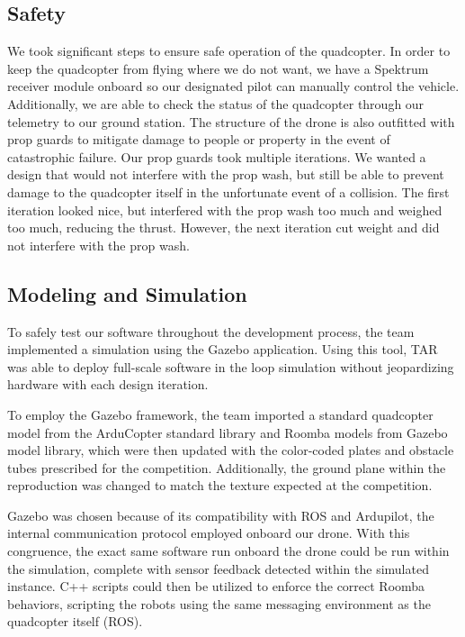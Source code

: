 \documentclass[12pt,letterpaper]{article}
\begin{document}
	\subsection*{Safety}
		We took significant steps to ensure safe operation of the quadcopter. In order to keep the quadcopter from flying where we do not want, we have a Spektrum receiver module onboard so our designated pilot can manually control the vehicle. Additionally, we are able to check the status of the quadcopter through our telemetry to our ground station. The structure of the drone is also outfitted with prop guards to mitigate damage to people or property in the event of catastrophic failure. Our prop guards took multiple iterations. We wanted a design that would not interfere with the prop wash, but still be able to prevent damage to the quadcopter itself in the unfortunate event of a collision. The first iteration looked nice, but interfered with the prop wash too much and weighed too much, reducing the thrust. However, the next iteration cut weight and did not interfere with the prop wash.


	\subsection*{Modeling and Simulation}

		To safely test our software throughout the development process, the team implemented a simulation using the Gazebo application. Using this tool, TAR was able to deploy full-scale software in the loop simulation without jeopardizing hardware with each design iteration.

		To employ the Gazebo framework, the team imported a standard quadcopter model from the ArduCopter standard library and Roomba models from Gazebo model library, which were then updated with the color-coded plates and obstacle tubes prescribed for the competition. Additionally, the ground plane within the reproduction was changed to match the texture expected at the competition.

		Gazebo was chosen because of its compatibility with ROS and Ardupilot, the internal communication protocol employed onboard our drone. With this congruence, the exact same software run onboard the drone could be run within the simulation, complete with sensor feedback detected within the simulated instance. C++ scripts could then be utilized to enforce the correct Roomba behaviors, scripting the robots using the same messaging environment as the quadcopter itself (ROS).
\end{document}
